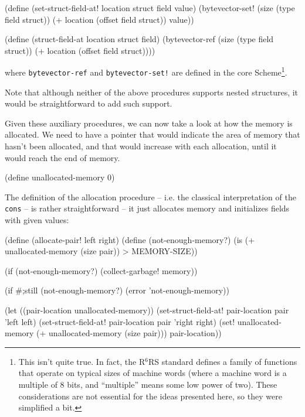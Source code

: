 \begin{Snippet}
(define (set-struct-field-at! location struct field value)
  (bytevector-set! (size (type field struct))
                   (+ location (offset field struct))
                   value))
\end{Snippet}

\begin{Snippet}
(define (struct-field-at location struct field)
  (bytevector-ref (size (type field struct))
                  (+ location (offset field struct))))
\end{Snippet}

where \texttt{bytevector-ref} and \texttt{bytevector-set!} are defined
in the core Scheme\footnote{This isn't quite true. In fact, the R$^6$RS
  standard defines a family of functions that operate on typical sizes
  of machine words (where a machine word is a multiple of 8 bits, and
  ``multiple'' means some low power of two)\cite{R6RS}. These considerations
  are not essential for the ideas presented here, so they were
  simplified a bit.}.

Note that although neither of the above procedures supports
nested structures, it would be straightforward to add such support.

Given these auxiliary procedures, we can now take a look at
how the memory is allocated. We need to have a pointer that
would indicate the area of memory that hasn't been allocated,
and that would increase with each allocation, until it would
reach the end of memory.

\begin{Snippet}
(define unallocated-memory 0)
\end{Snippet}

The definition of the allocation procedure -- i.e. the classical
interpretation of the \texttt{cons} -- is rather straightforward
-- it just allocates memory and initializes fields with given values:

\begin{Snippet}
(define (allocate-pair! left right)
  (define (not-enough-memory?)
    (is (+ unallocated-memory (size pair)) > MEMORY-SIZE))

  (if (not-enough-memory?)
    (collect-garbage! memory))
  
  (if #;still (not-enough-memory?)
    (error 'not-enough-memory))

  (let ((pair-location unallocated-memory))
    (set-struct-field-at! pair-location pair 'left left)
    (set-struct-field-at! pair-location pair 'right right)
    (set! unallocated-memory (+ unallocated-memory (size pair)))
    pair-location))
\end{Snippet}

